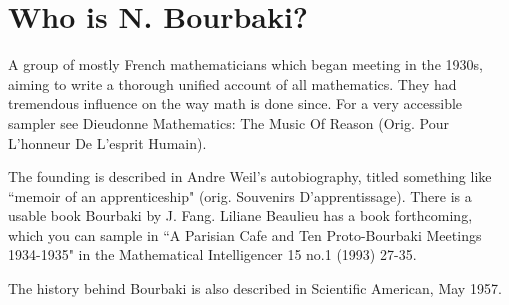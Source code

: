 \section{Who is N. Bourbaki?}

A group of mostly French mathematicians
which began meeting in the 1930s, aiming to write a thorough unified
account of all mathematics. They had tremendous influence on
the way math is done since. For a very accessible sampler see
Dieudonne Mathematics: The Music Of Reason (Orig. Pour L'honneur
De L'esprit Humain).


The founding is described in
Andre Weil's autobiography, titled something like ``memoir of
an apprenticeship" (orig. Souvenirs D'apprentissage). There is a
usable book Bourbaki by J. Fang. Liliane Beaulieu has a book
forthcoming, which you can sample in ``A Parisian Cafe and
Ten Proto-Bourbaki Meetings 1934-1935" in the Mathematical
Intelligencer 15 no.1 (1993) 27-35.

The history behind Bourbaki is also described in Scientific American,
May 1957.


